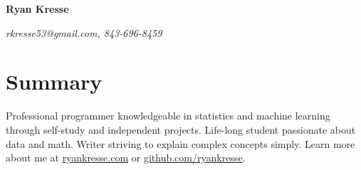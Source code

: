 \documentclass[11pt]{article}
\begin{document}
	\begin{flushleft}
		\textbf{{\Huge Ryan Kresse}}
	\end{flushleft}
	\emph{rkresse53@gmail.com, 843-696-8459}
	
	\section{Summary}
		Professional programmer knowledgeable in statistics and machine learning through self-study and independent projects.
		Life-long student passionate about data and math. Writer striving to explain complex concepts simply. Learn more about me at \href{http://ryankresse.com/blog}{ryankresse.com} or \href{https://github.com/ryankresse}{github.com/ryankresse}.  
	\begin{comment}
	\section{Contact and Links}
		\begin{itemize}[noitemsep]
			\item rkresse53@gmail.com
			\item ryankresse.com
			\item github.com/ryankresse
		\end{itemize}
	\end{comment}
	
\end{document}
